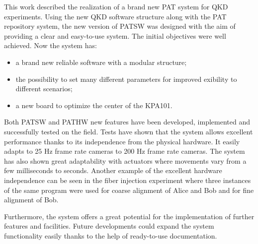 This work described the realization of a brand new PAT system for QKD experiments. Using the new QKD software structure along with the PAT repository system, the new version of PATSW was designed with the aim of providing a clear and easy-to-use system. The initial objectives were well achieved. Now the system has:
\begin{itemize}
  \item a brand new reliable software with a modular structure;
  \item the possibility to set many different parameters for improved exibility to different scenarios;
  \item a new board to optimize the center of the KPA101.
\end{itemize}
Both PATSW and PATHW new features have been developed, implemented and
successfully tested on the field. Tests have shown that the system allows excellent performance thanks to its independence from the physical hardware. It easily adapts to 25 Hz frame rate cameras to 200 Hz frame rate cameras. The system has also shown great adaptability with actuators where movements vary from a few milliseconds to seconds. Another example of the excellent hardware independence can be seen in the fiber injection experiment where three instances of the same program were used for coarse alignment of Alice and Bob and for fine alignment of Bob.

Furthermore, the system offers a great potential for the implementation of further
features and facilities. Future developments could expand the system functionality easily thanks to the help of ready-to-use documentation.